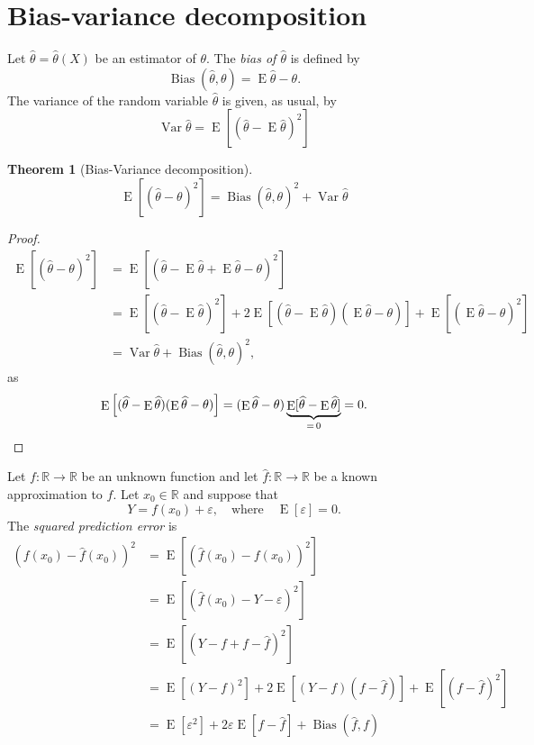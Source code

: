 \documentclass[12pt]{amsart}
\renewcommand{\epsilon}{\varepsilon}
\renewcommand{\hat}{\widehat}
\newcommand{\RR}{\mathbb{R}}
\DeclareMathOperator{\Bias}{Bias}
\DeclareMathOperator{\EE}{E}
\DeclareMathOperator{\Var}{Var}
\newtheorem{theorem}{Theorem}
\begin{document}
\section{Bias-variance decomposition}
Let $\hat\theta=\hat\theta(X)$ be an estimator of $\theta$. The \emph{bias of $\hat\theta$} is defined by
\[
    \Bias(\hat\theta,\theta) = \EE\hat\theta - \theta.
\]
The variance of the random variable $\hat\theta$ is given, as usual, by
\[
    \Var \hat\theta = \EE\left[(\hat\theta - \EE\hat\theta)^2\right]
\]
\begin{theorem}[Bias-Variance decomposition]
\[
    \EE\left[(\hat\theta - \theta)^2\right] = \Bias(\hat\theta,\theta)^2 + \Var\hat\theta
\]
\end{theorem}
\begin{proof}
    \begin{align*}
        \EE\left[(\hat\theta - \theta)^2\right] &= \EE\left[(\hat\theta - \EE\hat\theta + \EE\hat\theta - \theta)^2\right]\\
        &= \EE\left[(\hat\theta - \EE\hat\theta)^2\right] 
        + 2\EE\left[(\hat\theta - \EE\hat\theta)(\EE\hat\theta - \theta)\right]
        + \EE\left[(\EE\hat\theta - \theta)^2\right]\\
        &= \Var \hat\theta + \Bias(\hat\theta,\theta)^2,
    \end{align*}
    as
    \[
        \EE\left[(\hat\theta - \EE\hat\theta)(\EE\hat\theta - \theta)\right]
        = (\EE\hat\theta - \theta)\underbrace{\EE[\hat\theta - \EE\hat\theta]}_{=\,0}
        = 0.\qedhere
    \]
\end{proof}
Let $f:\RR\to\RR$ be an unknown function and let $\hat f:\RR\to\RR$ be a known approximation to $f$.
Let $x_0\in\RR$ and suppose that
\[
    Y = f(x_0) + \epsilon,\quad\text{where}\quad \EE[\epsilon]=0.
\]
The \emph{squared prediction error} is
 \begin{align*}
     (f(x_0)-\hat f(x_0))^2 &=\EE\left[(\hat f(x_0)- f(x_0))^2\right]\\
     &=\EE\left[(\hat f(x_0)- Y - \epsilon)^2\right]\\
     &= \EE\left[(Y - f + f - \hat f)^2\right]\\
     &= \EE\left[(Y - f)^2\right] 
     + 2\EE\left[(Y - f)(f - \hat f)\right]
     + \EE\left[(f - \hat f)^2\right]\\
     &= \EE[\epsilon^2]
     + 2\epsilon\EE[f - \hat f]
     + \Bias(\hat f, f)
 \end{align*}
\end{document}
